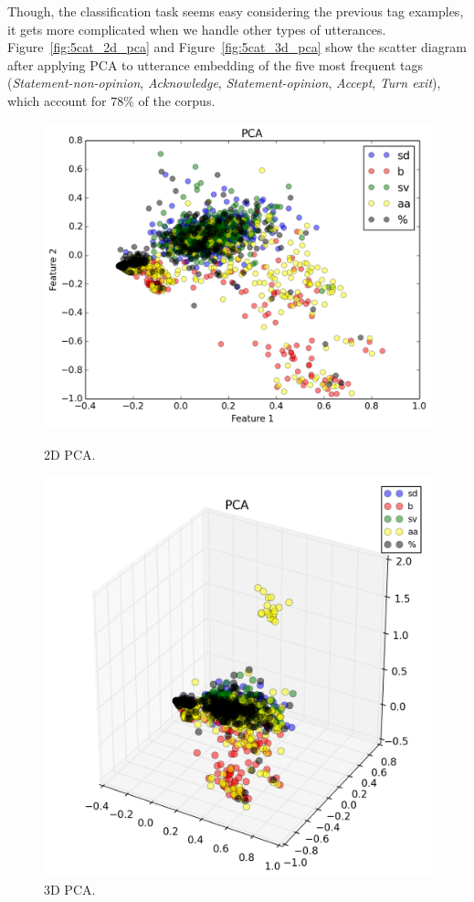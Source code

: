 Though, the classification task seems easy considering the previous tag examples, it gets more complicated when we handle other types of utterances.
Figure~\ref{fig:5cat_2d_pca} and Figure~\ref{fig:5cat_3d_pca} show the scatter diagram after applying PCA to utterance embedding of the five most frequent tags (\emph{Statement-non-opinion}, \emph{Acknowledge}, \emph{Statement-opinion}, \emph{Accept}, \emph{Turn exit}), which account for $78\%$ of the corpus.

\begin{figure}
\centering
\begin{minipage}{.23\textwidth}
\includegraphics[width=1\textwidth]{img/complex_pca_2d}
\caption{2D PCA.}
\label{fig:2d_pca}
\end{minipage}
\begin{minipage}{.23\textwidth}
\includegraphics[width=1\textwidth]{img/complex_pca_3d}
\caption{3D PCA.}
\label{fig:3d_pca}
\end{minipage}
\end{figure}
